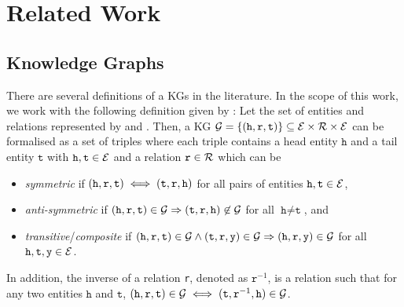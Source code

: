 \chapter{Related Work}
\label{ch:relatedwork}

\section{Knowledge Graphs} 
There are several definitions of a \acp{KG} in the literature. 
In the scope of this work, we work with the following definition given by \cite{ConEx, RotatE}:
Let the set of entities and relations represented by \entities and \relations.
Then, a \ac{KG} $\mathcal{G}= \{(\texttt{h}, \texttt{r}, \texttt{t}) \}  \subseteq \mathcal{E} \times \mathcal{R} \times \mathcal{E}$ can be formalised as a set of triples where each triple contains a head entity $\texttt{h}$ and a tail entity $\texttt{t}$ with $\texttt{h}, \texttt{t} \in \mathcal{E}$ and a relation $\texttt{r} \in \mathcal{R}$ which can be
\begin{itemize}
    \item 
    \emph{symmetric} if $(\texttt{h}, \texttt{r}, \texttt{t}) \iff (\texttt{t}, \texttt{r}, \texttt{h})$ for all pairs of entities $\texttt{h},\texttt{t}\in \mathcal{E}$, 
   
   \item 
   \emph{anti-symmetric} if $(\texttt{h}, \texttt{r}, \texttt{t}) \in \mathcal{G} \Rightarrow (\texttt{t}, \texttt{r}, \texttt{h}) \not \in \mathcal{G}$ for all $\texttt{h} \not= \texttt{t}$, and
    
    \item 
    \emph{transitive}/\emph{composite} if $(\texttt{h}, \texttt{r}, \texttt{t})\in\mathcal{G} \wedge (\texttt{t}, \texttt{r}, \texttt{y}) \in \mathcal{G}  \Rightarrow (\texttt{h}, \texttt{r}, \texttt{y}) \in \mathcal{G}$ for all $\texttt{h},\texttt{t},\texttt{y}\in \mathcal{E}$.
\end{itemize}
In addition, the inverse of a relation \texttt{r}, denoted as $\texttt{r}^{-1}$, is a relation such that for any two entities $\texttt{h}$ and $\texttt{t}$, $(\texttt{h}, \texttt{r}, \texttt{t}) \in \mathcal{G} \iff (\texttt{t},\texttt{r}^{-1},\texttt{h}) \in \mathcal{G} $.

